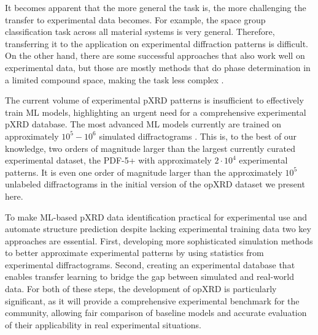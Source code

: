 It becomes apparent that the more general the task is, the more challenging the transfer to experimental data becomes. For example, the space group classification task across all material systems is very general. Therefore, transferring it to the application on experimental diffraction patterns is difficult. \cite{Schopmans2023, Lee2022, Vecsei2018} On the other hand, there are some successful approaches that also work well on experimental data, but those are mostly methods that do phase determination in a limited compound space, making the task less complex \cite{Schuetzke2024, Lee2020}. 

The current volume of experimental pXRD patterns is insufficient to effectively train ML models, highlighting an urgent need for a comprehensive experimental pXRD database. The most advanced ML models currently are trained on approximately $10^5 - 10^6$ simulated diffractograms \cite{Salgado2023, Schopmans2023}. This is, to the best of our knowledge, two orders of magnitude larger than the largest currently curated experimental dataset, the PDF-5+ with approximately $2\cdot 10^4$ experimental patterns. It is even one order of magnitude larger than the approximately $10^5$ unlabeled diffractograms in the initial version of the opXRD dataset we present here.

To make ML-based pXRD data identification practical for experimental use and automate structure prediction despite lacking experimental training data two key approaches are essential. First, developing more sophisticated simulation methods to better approximate experimental patterns\cite{cao2024simxrd} by using statistics from experimental diffractograms. Second, creating an experimental database that enables transfer learning to bridge the gap between simulated and real-world data. For both of these steps, the development of opXRD is particularly significant, as it will provide a comprehensive experimental benchmark for the community, allowing fair comparison of baseline models and accurate evaluation of their applicability in real experimental situations.